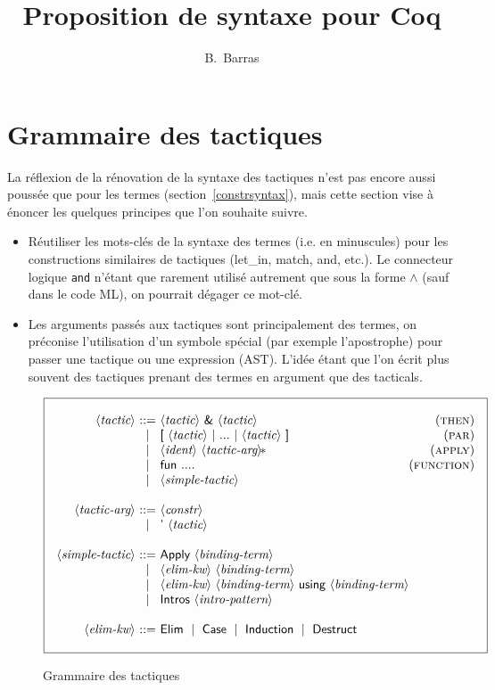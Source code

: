 \documentclass{article}
\author{B.~Barras}
\title{Proposition de syntaxe pour Coq}
\makeatletter
\def\NT#1{\langle\textit{#1}\rangle}
\def\TERM#1{\textsf{#1}}
\def\STAR#1{#1\!*}
\newenvironment{cadre}
        {\begin{array}{|c|}\hline\\}
        {\\\\\hline\end{array}}
\newenvironment{rulebox}
        {$$\begin{cadre}\begin{array}{r@{~}c@{~}l@{}r}}
        {\end{array}\end{cadre}$$}
\def\DEFNT#1{\NT{#1} & ::= &}
\def\RNAME#1{(\textsc{#1})}
\def\SEPDEF{\\\\}
\def\nlsep{\\&|&}
\makeatother
\begin{document}
\maketitle

\section{Grammaire des tactiques}
\label{tacticsyntax}

La réflexion de la rénovation de la syntaxe des tactiques n'est pas
encore aussi poussée que pour les termes (section~\ref{constrsyntax}),
mais cette section vise à énoncer les quelques principes que l'on
souhaite suivre.

\begin{itemize}
\item Réutiliser les mots-clés de la syntaxe des termes (i.e. en
  minuscules) pour les constructions similaires de tactiques (let_in,
  match, and, etc.). Le connecteur logique \texttt{and} n'étant que
  rarement utilisé autrement que sous la forme \texttt{$\wedge$} (sauf
  dans le code ML), on pourrait dégager ce mot-clé.
\item Les arguments passés aux tactiques sont principalement des
  termes, on préconise l'utilisation d'un symbole spécial (par exemple
  l'apostrophe) pour passer une tactique ou une expression
  (AST). L'idée étant que l'on écrit plus souvent des tactiques
  prenant des termes en argument que des tacticals.
\end{itemize}

\begin{figure}
\begin{rulebox}
\DEFNT{tactic}
       \NT{tactic} ~\TERM{\&} ~\NT{tactic}            & \RNAME{then}
\nlsep \TERM{[} ~\NT{tactic}~\TERM{|}~...
      ~\TERM{|}~\NT{tactic}~\TERM{]}                  & \RNAME{par}
\nlsep \NT{ident} ~\STAR{\NT{tactic-arg}}   ~~~       & \RNAME{apply}
\nlsep \TERM{fun} ~....                               & \RNAME{function}
\nlsep \NT{simple-tactic}
\SEPDEF
\DEFNT{tactic-arg}
       \NT{constr}
\nlsep \TERM{'} ~\NT{tactic}
\SEPDEF
\DEFNT{simple-tactic}
       \TERM{Apply} ~\NT{binding-term}
\nlsep \NT{elim-kw} ~\NT{binding-term}
\nlsep \NT{elim-kw} ~\NT{binding-term} ~\TERM{using} ~\NT{binding-term}
\nlsep \TERM{Intros} ~\NT{intro-pattern}
\SEPDEF
\DEFNT{elim-kw}
       \TERM{Elim} ~\mid~ \TERM{Case} ~\mid~ \TERM{Induction}
       ~\mid~ \TERM{Destruct}
\end{rulebox}
\caption{Grammaire des tactiques}
\label{tactic}
\end{figure}
\end{document}
